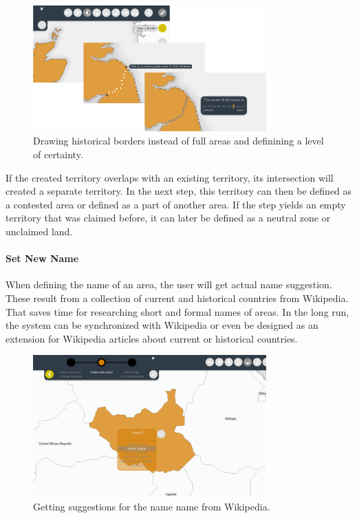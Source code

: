 \begin{figure}[H]
  \centering
  \includegraphics[width = 0.8\textwidth]{graphics/uncertainty/new_territory_tool}
  \caption{Drawing historical borders instead of full areas and definining a level of certainty.}
  \label{fig:uncertainty_new_territory_tool}
\end{figure}

If the created territory overlaps with an existing territory, its intersection will created a separate territory. In the next step, this territory can then be defined as a contested area or defined as a part of another area. If the step yields an empty territory that was claimed before, it can later be defined as a neutral zone or unclaimed land.



\paragraph{Set New Name} %
\label{par:set_new_name}

When defining the name of an area, the user will get actual name suggestion. These result from a collection of current and historical countries from Wikipedia. That saves time for researching short and formal names of areas. In the long run, the system can be synchronized with Wikipedia or even be designed as an extension for Wikipedia articles about current or historical countries.

\begin{figure}[H]
  \centering
  \includegraphics[width = 0.8\textwidth]{graphics/uncertainty/new_name_tool}
  \caption{Getting suggestions for the name name from Wikipedia.}
  \label{fig:uncertainty_new_name_tool}
\end{figure}


